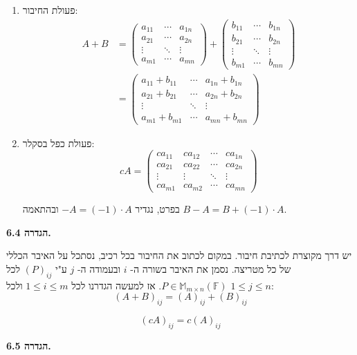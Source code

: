 \documentclass[12pt]{report}
\theoremstyle{plain}
\theoremstyle{definition}
\newcommand{\F}{\mathbb{F}}
\newcommand{\M}{\mathbb{M}}
\newcommand{\0}{\mathbf{0}}
\begin{document}
\begin{enumerate}[label=\alph*.]
\item 
פעולת החיבור:
$$
\begin{aligned}
A+B&=\begin{pmatrix}a_{11} & \cdots & a_{1n}\\
a_{21} & \cdots & a_{2n}\\
\vdots  & \ddots & \vdots\\
a_{m1}  & \cdots & a_{mn}
\end{pmatrix}+\begin{pmatrix}b_{11} & \cdots & b_{1n}\\
b_{21} & \cdots & b_{2n}\\
\vdots & \ddots & \vdots\\
b_{m1} & \cdots & b_{mn}
\end{pmatrix}\\
&=\begin{pmatrix}a_{11}+b_{11} & \cdots & a_{1n}+b_{1n} \\ a_{21}+b_{21} & \cdots & a_{2n}+b_{2n}\\
\vdots & \ddots & \vdots\\
a_{m1}+b_{m1} & \cdots & a_{mn}+b_{mn}
\end{pmatrix}
\end{aligned}
$$


\item
פעולת כפל בסקלר:
$$
c A=\begin{pmatrix}ca_{11} & ca_{12} & \cdots & ca_{1n}\\
ca_{21} & ca_{22} & \cdots & ca_{2n}\\
\vdots & \vdots & \ddots & \vdots\\
ca_{m1} & ca_{m2} & \cdots & ca_{mn}
\end{pmatrix}
$$

בפרט, נגדיר
$-A=(-1)\cdot A$ 
ובהתאמה 
$B-A=B+(-1)\cdot A$.


\end{enumerate}
\bigskip
\bigskip

\noindent\textbf{הגדרה 6.4.}

יש דרך מקוצרת לכתיבת חיבור. במקום לכתוב את החיבור בכל רכיב, נסתכל על האיבר הכללי של כל מטריצה. נסמן את האיבר בשורה ה-
$i$
ובעמודה ה-
$j$
ע"י
$(P)_{ij}$
לכל
$P\in\M_{m\times n}(\F)$. 
אז למעשה הגדרנו
לכל
$1\leq i \leq m$
ולכל
$1\leq j\leq n$:
$$(A+B)_{ij}=(A)_{ij}+(B)_{ij}$$

$$(c A)_{ij}=c(A)_{ij}$$
\bigskip
\bigskip

\noindent\textbf{הגדרה 6.5.}
\end{document}
